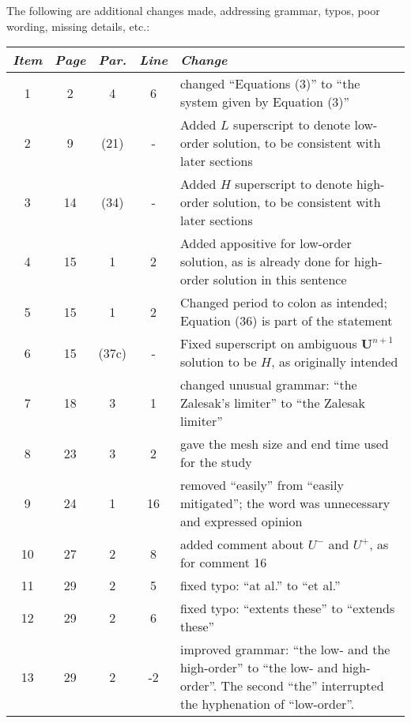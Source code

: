 The following are additional changes made, addressing grammar, typos, poor
wording, missing details, etc.:

\begin{tabular}{c c c c p{3in}}
\emph{Item} & \emph{Page} & \emph{Par.} & \emph{Line} & \emph{Change}\\\hline
1 & 2 & 4 & 6 & changed ``Equations (3)'' to ``the system given by Equation (3)''\\
2 & 9  & (21) & - & Added $L$ superscript to denote low-order solution, to be consistent with later sections\\
3 & 14 & (34) & - & Added $H$ superscript to denote high-order solution, to be consistent with later sections\\
4 & 15 & 1 & 2 & Added appositive for low-order solution, as is already done for high-order solution in this sentence\\
5 & 15 & 1 & 2 & Changed period to colon as intended; Equation (36) is part of the statement\\
6 & 15 & (37c) & - & Fixed superscript on ambiguous $\mathbf{U}^{n+1}$ solution to be $H$, as originally intended\\
7 & 18 & 3 & 1 & changed unusual grammar: ``the Zalesak's limiter'' to ``the Zalesak limiter''\\
8 & 23 & 3 & 2 & gave the mesh size and end time used for the study\\
9 & 24 & 1 & 16 & removed ``easily'' from ``easily mitigated''; the word was unnecessary and expressed opinion\\
10 & 27 & 2 & 8 & added comment about $U^-$ and $U^+$, as for comment 16\\
11 & 29 & 2 & 5 & fixed typo: ``at al.'' to ``et al.''\\
12 & 29 & 2 & 6 & fixed typo: ``extents these'' to ``extends these''\\
13 & 29 & 2 & -2 & improved grammar: ``the low- and the high-order'' to ``the low- and high-order''.
  The second ``the'' interrupted the hyphenation of ``low-order''.\\
\end{tabular}


